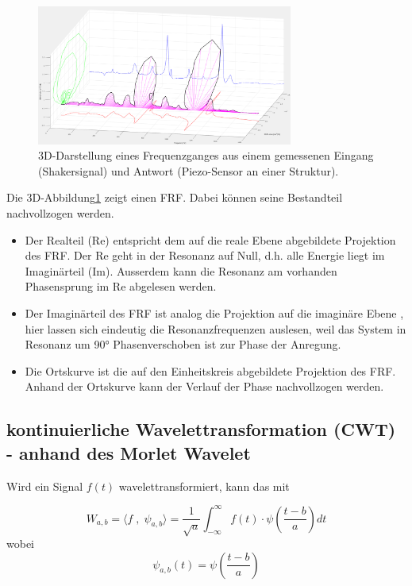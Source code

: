 \begin{figure}
	\centering
	\includegraphics[width=0.75\textwidth]{papers/wavelets/images/4_FRF_iso.png}
	\caption{3D-Darstellung eines Frequenzganges aus einem gemessenen Eingang (Shakersignal) und Antwort (Piezo-Sensor an einer Struktur).}
	\label{wavelet:fig:FRF_iso}
\end{figure}

Die 3D-Abbildung\ref{wavelet:fig:FRF_iso} zeigt einen FRF. Dabei können seine Bestandteil nachvollzogen werden.

\begin{itemize}
	\item Der Realteil (Re) entspricht dem auf die reale Ebene abgebildete Projektion des FRF. Der Re geht in der Resonanz auf Null, d.h. alle Energie liegt im Imaginärteil (Im). Ausserdem kann die Resonanz am vorhanden Phasensprung im Re abgelesen werden.
	\item Der Imaginärteil des FRF ist analog die Projektion auf die imaginäre Ebene , hier lassen sich eindeutig die Resonanzfrequenzen auslesen, weil das System in Resonanz um 90° Phasenverschoben ist zur Phase der Anregung.
	\item Die Ortskurve ist die auf den Einheitskreis abgebildete Projektion des FRF. Anhand der Ortskurve kann der Verlauf der Phase nachvollzogen werden.
\end{itemize}

\subsection{kontinuierliche Wavelettransformation (CWT) - anhand des Morlet Wavelet
	\label{wavelets:subsection:CWT}}
Wird ein Signal $f(t)$ wavelettransformiert, kann das mit

\begin{equation}
	W_{a,b}=\langle f \; , \; \psi_{a,b} \rangle = \frac{1}{\sqrt{a}}\int_{-\infty}^{\infty} f(t)\cdot\psi\left(\frac{t-b}{a}\right) dt
	\label{wavelets:equation3}
\end{equation}
wobei
\[\psi_{a,b}(t)=\psi\left(\frac{t-b}{a}\right)\]

